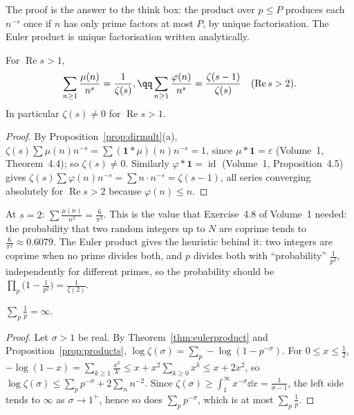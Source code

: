 The proof is the answer to the think box: the product over $p\le P$ produces each $n^{-s}$ once if $n$ has only prime factors
at most $P$, by unique factorisation. The Euler product is unique factorisation written analytically.

\begin{corollary}\label{cor:mobius}
For $\operatorname{Re}s>1$,
\[
\begin{gathered}\sum_{n\ge1}\frac{\mu(n)}{n^s}=\frac1{\zeta(s)},\qq\sum_{n\ge1}\frac{\varphi(n)}{n^s}=\frac{\zeta(s-1)}{\zeta(s)}\quad(\operatorname{Re}s>2).\end{gathered}
\]
In particular $\zeta(s)\ne0$ for $\operatorname{Re}s>1$.
\end{corollary}
\begin{proof}
By Proposition~\ref{prop:dirmult}(a), $\zeta(s)\sum\mu(n)n^{-s}=\sum(\mathbf 1*\mu)(n)n^{-s}=1$, since $\mu*\mathbf 1=\varepsilon$ (Volume~1, Theorem~4.4); so $\zeta(s)\ne0$.
Similarly $\varphi*\mathbf 1=\operatorname{id}$ (Volume~1, Proposition~4.5) gives $\zeta(s)\sum\varphi(n)n^{-s}=\sum n\cdot n^{-s}=\zeta(s-1)$, all series converging absolutely
for $\operatorname{Re}s>2$ because $\varphi(n)\le n$.
\end{proof}

At $s=2$: $\sum\frac{\mu(n)}{n^2}=\frac6{\pi^2}$. This is the value that Exercise~4.8 of Volume~1 needed: the probability that two random
integers up to $N$ are coprime tends to $\frac6{\pi^2}\approx0.6079$. The Euler product gives the heuristic behind it: two integers are
coprime when no prime divides both, and $p$ divides both with ``probability'' $\frac1{p^2}$, independently for different primes, so the
probability should be $\prod_p\bigl(1-\frac1{p^2}\bigr)=\frac1{\zeta(2)}$.

\begin{corollary}[Euler, 1737]\label{cor:primesdiverge}
$\displaystyle\sum_p\frac1p=\infty$.
\end{corollary}
\begin{proof}
Let $\sigma>1$ be real. By Theorem~\ref{thm:eulerproduct} and Proposition~\ref{prop:products}, $\log\zeta(\sigma)=\sum_p-\log(1-p^{-\sigma})$. For $0\le x\le\frac12$,
$-\log(1-x)=\sum_{k\ge1}\frac{x^k}k\le x+x^2\sum_{k\ge0}x^k\le x+2x^2$, so $\log\zeta(\sigma)\le\sum_pp^{-\sigma}+2\sum_nn^{-2}$. Since $\zeta(\sigma)\ge\int_1^\infty x^{-\sigma}\dd x=\frac1{\sigma-1}$,
the left side tends to $\infty$ as $\sigma\to1^+$, hence so does $\sum_pp^{-\sigma}$, which is at most $\sum_p\frac1p$.
\end{proof}

